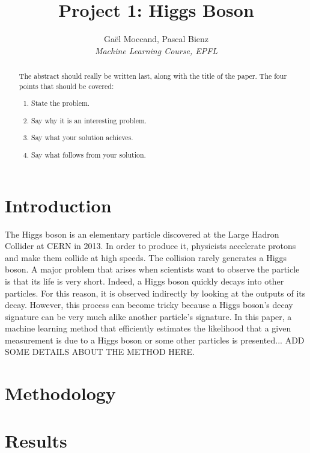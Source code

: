 \documentclass[10pt,conference,compsocconf]{IEEEtran}
\begin{document}
\title{Project 1: Higgs Boson}

\author{
  Gaël Moccand, Pascal Bienz\\
  \textit{Machine Learning Course, EPFL}
}

\maketitle

\begin{abstract}
The abstract should really be written last, along with the title of
the paper. The four points that should be covered:
\begin{enumerate}
\item State the problem.
\item Say why it is an interesting problem.
\item Say what your solution achieves.
\item Say what follows from your solution.
\end{enumerate}
\end{abstract}

\section{Introduction}
The Higgs boson is an elementary particle discovered at the Large Hadron Collider at CERN in 2013. In order to produce it, physicists accelerate protons and make them collide at high speeds. The collision rarely generates a Higgs boson. A major problem that arises when scientists want to observe the particle is that its life is very short. Indeed, a Higgs boson quickly decays into other particles. For this reason, it is observed indirectly by looking at the outputs of its decay. However, this process can become tricky because a Higgs boson's decay signature can be very much alike another particle's signature. In this paper, a machine learning method that efficiently estimates the likelihood that a given measurement is due to a Higgs boson or some other particles is presented... ADD SOME DETAILS ABOUT THE METHOD HERE.

\section{Methodology}

\section{Results}
\end{document}
